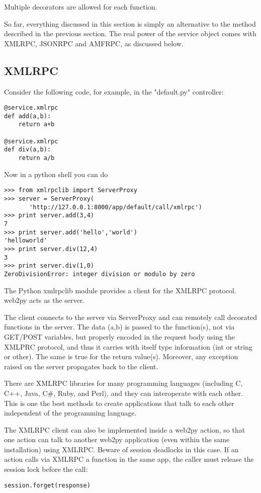 \documentclass[justified,sixbynine,notoc]{tufte-book}
\def\inxx#1{\index{#1}}
\begin{document}
\begin{fullwidth}
Multiple decorators are allowed for each function.

So far, everything discussed in this section is simply an alternative to the method described in the previous section. The real power of the service object comes with XMLRPC, JSONRPC and AMFRPC, as discussed below.

\goodbreak\subsection{XMLRPC}

\inxx{XMLRPC}

Consider the following code, for example, in the "default.py" controller:
\begin{lstlisting}
@service.xmlrpc
def add(a,b):
    return a+b

@service.xmlrpc
def div(a,b):
    return a/b
\end{lstlisting}

Now in a python shell you can do
\begin{lstlisting}
>>> from xmlrpclib import ServerProxy
>>> server = ServerProxy(
       'http://127.0.0.1:8000/app/default/call/xmlrpc')
>>> print server.add(3,4)
7
>>> print server.add('hello','world')
'helloworld'
>>> print server.div(12,4)
3
>>> print server.div(1,0)
ZeroDivisionError: integer division or modulo by zero
\end{lstlisting}

The Python xmlrpclib module provides a client for the XMLRPC protocol. web2py acts as the server.

The client connects to the server via ServerProxy and can remotely call decorated functions in the server. The data (a,b) is passed to the function(s), not via GET/POST variables, but properly encoded in the request body using the XMLPRC protocol, and thus it carries with itself type information (int or string or other). The same is true for the return value(s). Moreover, any exception raised on the server propagates back to the client.

There are XMLRPC libraries for many programming languages (including C, C++, Java, C\#, Ruby, and Perl), and they can interoperate with each other. This is one the best methods to create applications that talk to each other independent of the programming language.

The XMLRPC client can also be implemented inside a web2py action, so that one action can talk to another web2py application (even within the same installation) using XMLRPC. Beware of session deadlocks in this case. If an action calls via XMLRPC a function in the same app, the caller must release the session lock before the call:
\begin{lstlisting}
session.forget(response)
\end{lstlisting}


\end{fullwidth}
\end{document}
